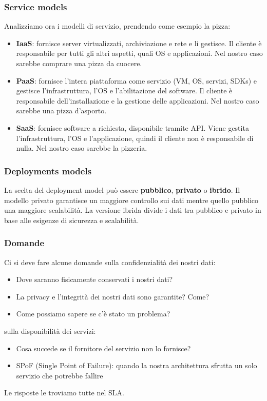 \subsubsection{Service models}
Analizziamo ora i modelli di servizio, prendendo come esempio la pizza:
\begin{itemize}
	\item \textbf{IaaS}: fornisce server virtualizzati, archiviazione e rete e li gestisce. Il cliente è responsabile per tutti gli altri aspetti, quali OS e applicazioni. Nel nostro caso sarebbe comprare una pizza da cuocere.
	\item \textbf{PaaS}: fornisce l'intera piattaforma come servizio (VM, OS, servizi, SDKs) e gestisce l'infrastruttura, l'OS e l'abilitazione del software. Il cliente è responsabile dell'installazione e la gestione delle applicazioni. Nel nostro caso sarebbe una pizza d'asporto.
	\item \textbf{SaaS}: fornisce software a richiesta, disponibile tramite API. Viene gestita l'infrastruttura, l'OS e l'applicazione, quindi il cliente non è responsabile di nulla. Nel nostro caso sarebbe la pizzeria.
\end{itemize}

\subsubsection{Deployments models}
La scelta del deployment model può essere \textbf{pubblico}, \textbf{privato} o \textbf{ibrido}. Il modello privato garantisce un maggiore controllo sui dati mentre quello pubblico una maggiore scalabilità. La versione ibrida divide i dati tra pubblico e privato in base alle esigenze di sicurezza e scalabilità.
\subsubsection{Domande}
Ci si deve fare alcune domande sulla confidenzialità dei nostri dati:
\begin{itemize}
	\item Dove saranno fisicamente conservati i nostri dati?
	\item La privacy e l'integrità dei nostri dati sono garantite? Come?
	\item Come possiamo sapere se c'è stato un problema?
\end{itemize}
sulla disponibilità dei servizi: 
\begin{itemize}
	\item Cosa succede se il fornitore del servizio non lo fornisce?
	\item SPoF (Single Point of Failure): quando la nostra architettura sfrutta un solo servizio che potrebbe fallire
\end{itemize}
Le risposte le troviamo tutte nel SLA.

